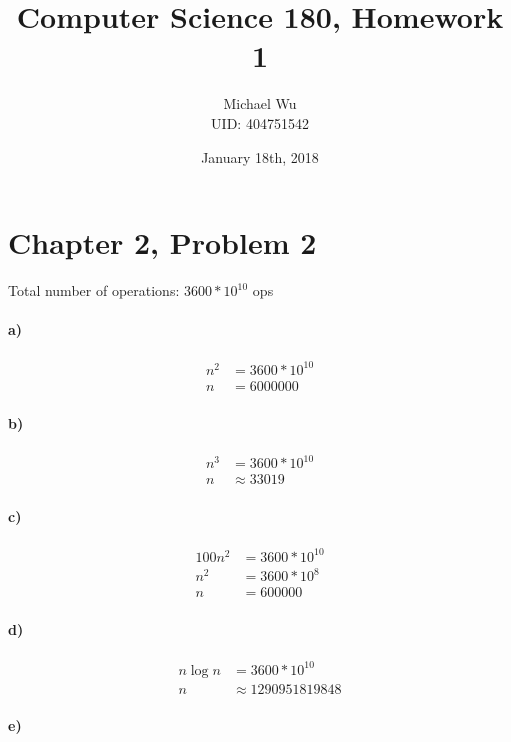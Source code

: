 \documentclass[12pt]{article}
\begin{document}
\title{Computer Science 180, Homework 1}
\date{January 18th, 2018}
\author{Michael Wu\\UID: 404751542}
\maketitle

\section*{Chapter 2, Problem 2}

Total number of operations: \(3600*10^{10}\) ops

\paragraph{a)}

\begin{align*}
        n^2&=3600*10^{10}\\
        n&=6000000
\end{align*}

\paragraph{b)}

\begin{align*}
        n^3&=3600*10^{10}\\
        n&\approx 33019
\end{align*}

\paragraph{c)}

\begin{align*}
        100n^2&=3600*10^{10}\\
        n^2&=3600*10^{8}\\
        n&=600000
\end{align*}

\paragraph{d)}

\begin{align*}
        n\log n&=3600*10^{10}\\
        n&\approx 1290951819848
\end{align*}

\paragraph{e)}
\end{document}
